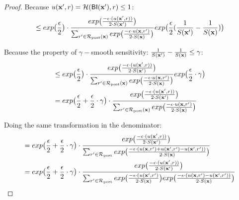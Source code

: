 \documentclass{article}
\begin{document}
\begin{proof}
  Because $u(\textbf{x}', {r}) = \mathcal{H}(\mathsf{BI}(\textbf{x}'), r) \leq 1$:
  \begin{equation*}
  \begin{split}
  & \leq exp\big( \frac{\epsilon}{2} \big) \cdot 
  \frac {
  exp
  \big(
  \frac{-\epsilon\cdot(u(\textbf{x}', {r}))}{2\cdot S(\textbf{x}')}
  \big)
  } 
  {\sum_{r'\in \mathcal{R}_{\textup{post}}(\textbf{x})} exp \big(\frac{-\epsilon\cdot u(\textbf{\textbf{x}}, r')}{2 \cdot S(\textbf{x})}\big)}
  exp
  \big(
  \frac{\epsilon}{2}(\frac{1}{S(\textbf{x}')} - \frac{1}{S(\textbf{x})})
  \big)\\
  \end{split}
  \end{equation*}

  Because the property of $\gamma -$smooth sensitivity: $\frac{1}{S(\textbf{x}')} - \frac{1}{S(\textbf{x})} \leq \gamma$:  
  \begin{equation*}
  \begin{split}
  & \leq exp\big( \frac{\epsilon}{2} \big) \cdot 
  \frac {
  exp
  \big(
  \frac{-\epsilon\cdot(u(\textbf{x}', {r}))}{2\cdot S(\textbf{x}')}
  \big)
  } 
  {\sum_{r'\in \mathcal{R}_{\textup{post}}(\textbf{x})} exp \big(\frac{-\epsilon\cdot u(\textbf{\textbf{x}}, r')}{2 \cdot S(\textbf{x})}\big)}
  exp
  \big(
  \frac{\epsilon}{2} \cdot \gamma
  \big)\\
  & = exp\big( \frac{\epsilon}{2} + \frac{\epsilon}{2} \cdot \gamma\big) \cdot 
  \frac {
  exp
  \big(
  \frac{-\epsilon\cdot(u(\textbf{x}', {r}))}{2\cdot S(\textbf{x}')}
  \big)
  } 
  {\sum_{r'\in \mathcal{R}_{\textup{post}}(\textbf{x})} exp \big(\frac{-\epsilon\cdot u(\textbf{\textbf{x}}, r')}{2 \cdot S(\textbf{x})}\big)}\\
  \end{split}
  \end{equation*}

  Doing the same transformation in the denominator:
  \begin{equation*}
  \begin{split}
  & = exp\big( \frac{\epsilon}{2} + \frac{\epsilon}{2} \cdot \gamma\big) \cdot 
  \frac {
  exp
  \big(
  \frac{-\epsilon\cdot(u(\textbf{x}', {r}))}{2\cdot S(\textbf{x}')}
  \big)
  } 
  {
  \sum_{r'\in \mathcal{R}_{\textup{post}}} 
  exp 
  \big(
  \frac{-\epsilon\cdot(u(\textbf{x}, {r'}) + u(\textbf{x}', {r'}) - u(\textbf{x}', {r'}))}{2 \cdot S(\textbf{x})}
  \big)
  }\\
  & = exp\big( \frac{\epsilon}{2} + \frac{\epsilon}{2} \cdot \gamma\big) \cdot 
  \frac {
  exp
  \big(
  \frac{-\epsilon\cdot(u(\textbf{x}', {r}))}{2\cdot S(\textbf{x}')}
  \big)
  } 
  {
  \sum_{r'\in \mathcal{R}_{\textup{post}}} 
  exp 
  \big(
  \frac{-\epsilon\cdot(u(\textbf{x}', {r'})}{2 \cdot S(\textbf{x})}
  \big)
  exp 
  \big(
  \frac{-\epsilon\cdot(u(\textbf{x}, {r'}) - u(\textbf{x}', {r'}))}{2 \cdot S(\textbf{x})}
  \big)
  }\\
  \end{split}
  \end{equation*}


\end{proof}
\end{document}
